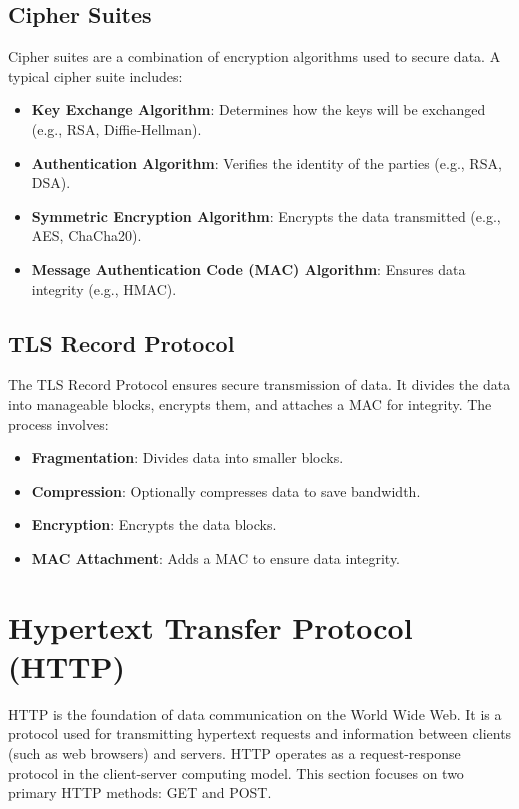 \subsection{Cipher Suites}
Cipher suites are a combination of encryption algorithms used to secure data. A typical cipher suite includes:
\begin{itemize}
    \item \textbf{Key Exchange Algorithm}: Determines how the keys will be exchanged (e.g., RSA, Diffie-Hellman).
    \item \textbf{Authentication Algorithm}: Verifies the identity of the parties (e.g., RSA, DSA).
    \item \textbf{Symmetric Encryption Algorithm}: Encrypts the data transmitted (e.g., AES, ChaCha20).
    \item \textbf{Message Authentication Code (MAC) Algorithm}: Ensures data integrity (e.g., HMAC).
\end{itemize}

\subsection{TLS Record Protocol}
The TLS Record Protocol ensures secure transmission of data. It divides the data into manageable blocks, encrypts them, and attaches a MAC for integrity. The process involves:
\begin{itemize}
    \item \textbf{Fragmentation}: Divides data into smaller blocks.
    \item \textbf{Compression}: Optionally compresses data to save bandwidth.
    \item \textbf{Encryption}: Encrypts the data blocks.
    \item \textbf{MAC Attachment}: Adds a MAC to ensure data integrity.
\end{itemize}

\section{Hypertext Transfer Protocol (HTTP)}

HTTP is the foundation of data communication on the World Wide Web. It is a protocol used for transmitting hypertext requests and information between clients (such as web browsers) and servers. HTTP operates as a request-response protocol in the client-server computing model. This section focuses on two primary HTTP methods: GET and POST.

